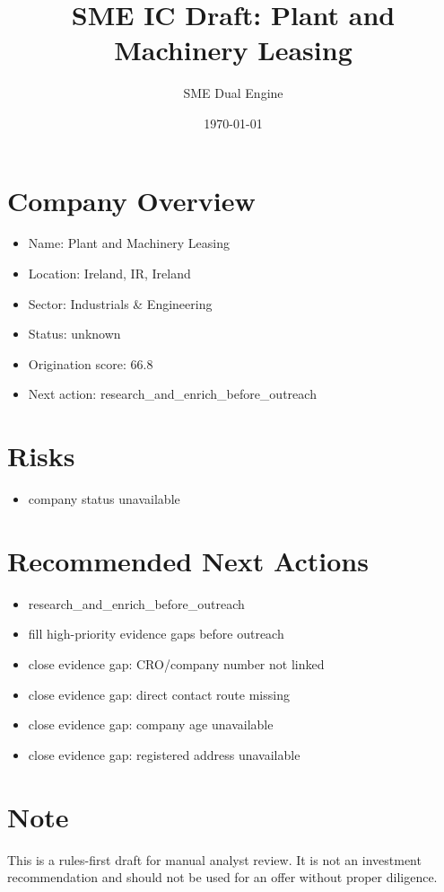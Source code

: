\documentclass[11pt,a4paper]{article}
\title{SME IC Draft: Plant and Machinery Leasing}
\author{SME Dual Engine}
\date{\today}
\begin{document}
\maketitle
\section*{Company Overview}
\begin{itemize}[leftmargin=1.4em]
\item Name: Plant and Machinery Leasing
\item Location: Ireland, IR, Ireland
\item Sector: Industrials \& Engineering
\item Status: unknown
\item Origination score: 66.8
\item Next action: research\_and\_enrich\_before\_outreach
\end{itemize}
\section*{Risks}
\begin{itemize}[leftmargin=1.4em]
\item company status unavailable
\end{itemize}
\section*{Recommended Next Actions}
\begin{itemize}[leftmargin=1.4em]
\item research\_and\_enrich\_before\_outreach
\item fill high-priority evidence gaps before outreach
\item close evidence gap: CRO/company number not linked
\item close evidence gap: direct contact route missing
\item close evidence gap: company age unavailable
\item close evidence gap: registered address unavailable
\end{itemize}
\section*{Note}
This is a rules-first draft for manual analyst review. It is not an investment
recommendation and should not be used for an offer without proper diligence.
\end{document}

